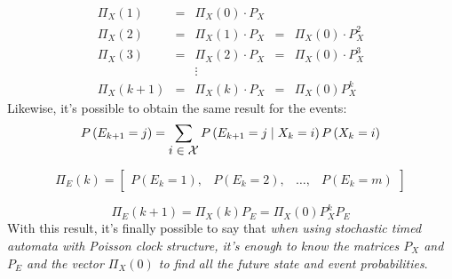 \documentclass[12pt,a4paper]{article}
\begin{document}
$$
\begin{matrix}
\Pi_X(1)&=&\Pi_X(0) \cdot P_X\\
\Pi_X(2)&=&\Pi_X(1) \cdot P_X&=&\Pi_X(0) \cdot P_X^2\\
\Pi_X(3)&=&\Pi_X(2) \cdot P_X&=&\Pi_X(0) \cdot P_X^3\\
&&\vdots\\
\Pi_X(k+1)&=&\Pi_X(k) \cdot P_X&=&\Pi_X(0)P_X^k
\end{matrix}
$$
Likewise, it's possible to obtain the same result for the events: 
$$
P\left(E_{k+1}=j\right)=\sum_{\mathlarger{i\in\mathcal{X}}}{P\left(E_{k+1}=j \mid X_k=i\right)P\left(X_k=i\right)}
$$

$$
\Pi_E(k)=
\left[
\begin{matrix}
P\left(E_k=1\right),&
P\left(E_k=2\right),&
\dots,&
P\left(E_k=m\right)
\end{matrix}
\right]
$$

$$
\Pi_E(k+1)=\Pi_X(k)P_E=\Pi_X(0)P_X^kP_E
$$
With this result, it's finally possible to say that \emph{when using stochastic timed automata with Poisson clock structure, it's enough to know the matrices $P_X$ and $P_E$ and the vector $\Pi_X(0)$ to find all the future state and event probabilities}. 
\end{document}
